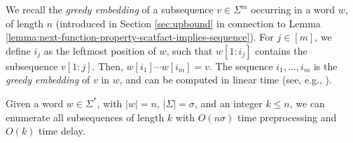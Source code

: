 \documentclass[runningheads,UKenglish,cleveref, autoref, thm-restate]{llncs}
\begin{document}
We recall the {\em greedy embedding} of a subsequence $v \in \Sigma^m$ occurring in a word $w$, of length $n$ (introduced in Section \ref{sec:upbound} in connection to Lemma \ref{lemma:next-function-property-scatfact-implies-sequence}). For $j\in [m]$, we define $i_j$ as the leftmost position of $w$, such that $w[1:i_j]$ contains the subsequence $v[1:j]$. Then, $w[i_1]\cdots w[i_m]=v$. The sequence $i_1,\ldots,i_m$ is the {\em greedy embedding} of $v$ in $w$, and can be computed in linear time (see, e.g., \cite{DBLP:journals/fuin/KoscheKMS22}). 

\begin{lemma}\label{lemmaDFA}
Given a word $w \in \Sigma^*$, with $|w|=n$, $|\Sigma|=\sigma$, and an integer $k \leq n$, we can enumerate all subsequences of length $k$ with $O(n \sigma)$ time preprocessing and $O(k)$ time delay.
\end{lemma}
\end{document}
